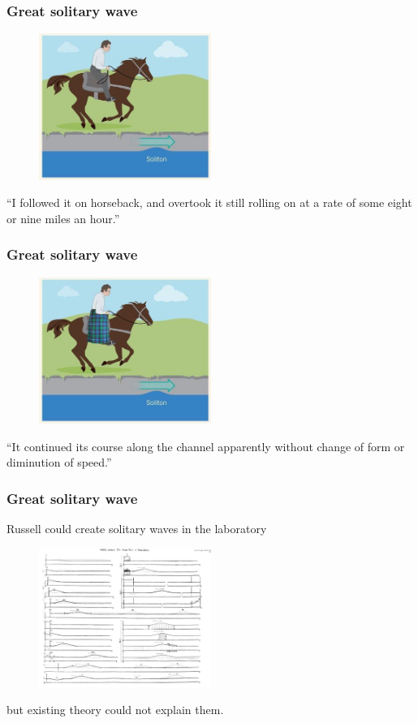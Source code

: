 \documentclass[16pt]{beamer}
\begin{document}
\begin{frame}
	\frametitle{ Great solitary wave }   
	\fontsize{16}{7.2}\selectfont
\begin{figure}[H]
\centering
\includegraphics[width=0.5\textwidth]{images/horsebefore.jpg}
\end{figure}
``I followed it on horseback, and overtook it still rolling on at a rate of some eight or nine miles an hour.''
\end{frame}

\begin{frame}
	\frametitle{ Great solitary wave }   
	\fontsize{16}{7.2}\selectfont
\begin{figure}[H]
\centering
\includegraphics[width=0.5\textwidth]{images/horsekilt.jpg}
\end{figure}
``It continued its course along the channel apparently without change of form or diminution of speed.''
\end{frame}

\begin{frame}
	\frametitle{ Great solitary wave }   
	\fontsize{16}{7.2}\selectfont
Russell could create solitary waves in the laboratory
\begin{figure}[H]
\centering
\includegraphics[width=0.5\textwidth]{images/russellwaves.jpg}
\end{figure}
but existing theory could not explain them.
\end{frame}
\end{document}
